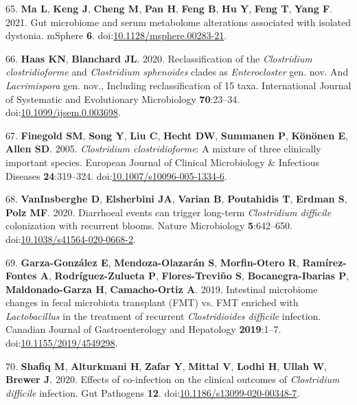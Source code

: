 \documentclass[
  12pt,
]{article}
\newenvironment{cslreferences}%
  {}%
  {\par}
\begin{document}
\begin{cslreferences}
\leavevmode\hypertarget{ref-Ma2021}{}%
65. \textbf{Ma L}, \textbf{Keng J}, \textbf{Cheng M}, \textbf{Pan H},
\textbf{Feng B}, \textbf{Hu Y}, \textbf{Feng T}, \textbf{Yang F}. 2021.
Gut microbiome and serum metabolome alterations associated with isolated
dystonia. mSphere \textbf{6}.
doi:\href{https://doi.org/10.1128/msphere.00283-21}{10.1128/msphere.00283-21}.

\leavevmode\hypertarget{ref-Haas2020}{}%
66. \textbf{Haas KN}, \textbf{Blanchard JL}. 2020. Reclassification of
the \emph{Clostridium clostridioforme} and \emph{Clostridium sphenoides}
clades as \emph{Enterocloster} gen. nov. And \emph{Lacrimispora} gen.
nov., Including reclassification of 15 taxa. International Journal of
Systematic and Evolutionary Microbiology \textbf{70}:23--34.
doi:\href{https://doi.org/10.1099/ijsem.0.003698}{10.1099/ijsem.0.003698}.

\leavevmode\hypertarget{ref-Finegold2005}{}%
67. \textbf{Finegold SM}, \textbf{Song Y}, \textbf{Liu C}, \textbf{Hecht
DW}, \textbf{Summanen P}, \textbf{Könönen E}, \textbf{Allen SD}. 2005.
\emph{Clostridium clostridioforme}: A mixture of three clinically
important species. European Journal of Clinical Microbiology \&
Infectious Diseases \textbf{24}:319--324.
doi:\href{https://doi.org/10.1007/s10096-005-1334-6}{10.1007/s10096-005-1334-6}.

\leavevmode\hypertarget{ref-VanInsberghe2020}{}%
68. \textbf{VanInsberghe D}, \textbf{Elsherbini JA}, \textbf{Varian B},
\textbf{Poutahidis T}, \textbf{Erdman S}, \textbf{Polz MF}. 2020.
Diarrhoeal events can trigger long-term \emph{Clostridium difficile}
colonization with recurrent blooms. Nature Microbiology
\textbf{5}:642--650.
doi:\href{https://doi.org/10.1038/s41564-020-0668-2}{10.1038/s41564-020-0668-2}.

\leavevmode\hypertarget{ref-GarzaGonzalez2019}{}%
69. \textbf{Garza-González E}, \textbf{Mendoza-Olazarán S},
\textbf{Morfin-Otero R}, \textbf{Ramírez-Fontes A},
\textbf{Rodríguez-Zulueta P}, \textbf{Flores-Treviño S},
\textbf{Bocanegra-Ibarias P}, \textbf{Maldonado-Garza H},
\textbf{Camacho-Ortiz A}. 2019. Intestinal microbiome changes in fecal
microbiota transplant (FMT) vs. FMT enriched with \emph{Lactobacillus}
in the treatment of recurrent \emph{Clostridioides difficile} infection.
Canadian Journal of Gastroenterology and Hepatology \textbf{2019}:1--7.
doi:\href{https://doi.org/10.1155/2019/4549298}{10.1155/2019/4549298}.

\leavevmode\hypertarget{ref-Shafiq2020}{}%
70. \textbf{Shafiq M}, \textbf{Alturkmani H}, \textbf{Zafar Y},
\textbf{Mittal V}, \textbf{Lodhi H}, \textbf{Ullah W}, \textbf{Brewer
J}. 2020. Effects of co-infection on the clinical outcomes of
\emph{Clostridium difficile} infection. Gut Pathogens \textbf{12}.
doi:\href{https://doi.org/10.1186/s13099-020-00348-7}{10.1186/s13099-020-00348-7}.


\end{cslreferences}
\end{document}
